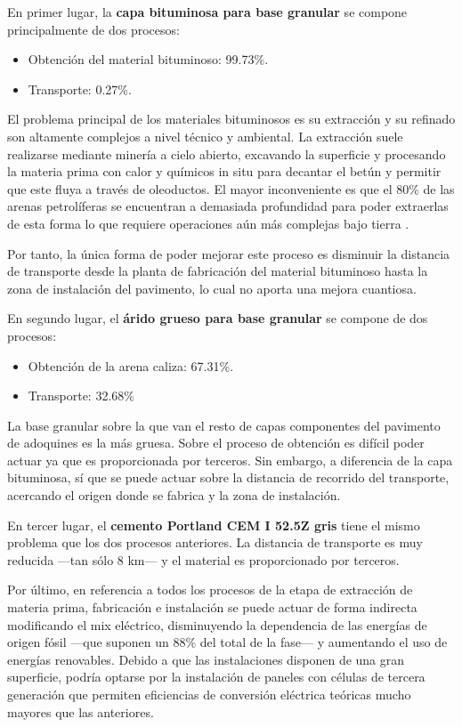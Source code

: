 En primer lugar, la \textbf{capa bituminosa para base granular} se compone principalmente de dos procesos:
\begin{itemize}
  \item Obtención del material bituminoso: 99.73\%.
  \item Transporte: 0.27\%.
\end{itemize}

El problema principal de los materiales bituminosos es su extracción y su refinado son altamente complejos a nivel técnico y ambiental. La extracción suele realizarse mediante minería a cielo abierto, excavando la superficie y procesando la materia prima con calor y químicos in situ para decantar el betún y permitir que este fluya a través de oleoductos. El mayor inconveniente es que el 80\% de las arenas petrolíferas se encuentran a demasiada profundidad para poder extraerlas de esta forma lo que requiere operaciones aún más complejas bajo tierra \cite{eurobitume}.

Por tanto, la única forma de poder mejorar este proceso es disminuir la distancia de transporte desde la planta de fabricación del material bituminoso hasta la zona de instalación del pavimento, lo cual no aporta una mejora cuantiosa.

En segundo lugar, el \textbf{árido grueso para base granular} se compone de dos procesos:
\begin{itemize}
  \item Obtención de la arena caliza: 67.31\%.
  \item Transporte: 32.68\%
\end{itemize}

La base granular sobre la que van el resto de capas componentes del pavimento de adoquines es la más gruesa. Sobre el proceso de obtención es difícil poder actuar ya que es proporcionada por terceros. Sin embargo, a diferencia de la capa bituminosa, sí que se puede actuar sobre la distancia de recorrido del transporte, acercando el origen donde se fabrica y la zona de instalación.

En tercer lugar, el \textbf{cemento Portland CEM I 52.5Z gris} tiene el mismo problema que los dos procesos anteriores. La distancia de transporte es muy reducida —tan sólo 8 \si{km}— y el material es proporcionado por terceros.

Por último, en referencia a todos los procesos de la etapa de extracción de materia prima, fabricación e instalación se puede actuar de forma indirecta modificando el mix eléctrico, disminuyendo la dependencia de las energías de origen fósil —que suponen un 88\% del total de la fase— y aumentando el uso de energías renovables. Debido a que las instalaciones disponen de una gran superficie, podría optarse por la instalación de paneles con células de tercera generación que permiten eficiencias de conversión eléctrica teóricas mucho mayores que las anteriores.


